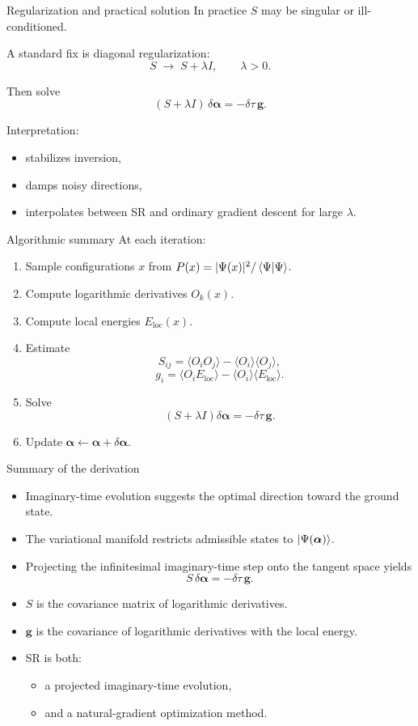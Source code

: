 \documentclass[aspectratio=169]{beamer}
\begin{document}
\begin{frame}{Regularization and practical solution}
In practice \(S\) may be singular or ill-conditioned.

A standard fix is diagonal regularization:
\[
S \;\to\; S + \lambda I,
\qquad \lambda>0.
\]

Then solve
\[
(S+\lambda I)\,\delta\bm{\alpha} = -\delta\tau\,\bm{g}.
\]

Interpretation:
\begin{itemize}
\item stabilizes inversion,
\item damps noisy directions,
\item interpolates between SR and ordinary gradient descent for large \(\lambda\).
\end{itemize}
\end{frame}

\begin{frame}{Algorithmic summary}
At each iteration:
\begin{enumerate}
\item Sample configurations \(x\) from \(P(x)=|\Psi(x)|^2/\braket{\Psi}{\Psi}\).
\item Compute logarithmic derivatives \(O_k(x)\).
\item Compute local energies \(E_{\mathrm{loc}}(x)\).
\item Estimate
\[
S_{ij}=\langle O_i O_j\rangle - \langle O_i\rangle\langle O_j\rangle,
\]
\[
g_i=\langle O_i E_{\mathrm{loc}}\rangle - \langle O_i\rangle\langle E_{\mathrm{loc}}\rangle.
\]
\item Solve
\[
(S+\lambda I)\delta\bm{\alpha}=-\delta\tau\,\bm{g}.
\]
\item Update \(\bm{\alpha}\leftarrow \bm{\alpha}+\delta\bm{\alpha}\).
\end{enumerate}
\end{frame}

\begin{frame}{Summary of the derivation}
\begin{itemize}
\item Imaginary-time evolution suggests the optimal direction toward the ground state.
\item The variational manifold restricts admissible states to \(\ket{\Psi(\bm{\alpha})}\).
\item Projecting the infinitesimal imaginary-time step onto the tangent space yields
\[
S\,\delta\bm{\alpha}=-\delta\tau\,\bm{g}.
\]
\item \(S\) is the covariance matrix of logarithmic derivatives.
\item \(\bm{g}\) is the covariance of logarithmic derivatives with the local energy.
\item SR is both:
\begin{itemize}
\item a projected imaginary-time evolution,
\item and a natural-gradient optimization method.
\end{itemize}
\end{itemize}
\end{frame}
\end{document}
